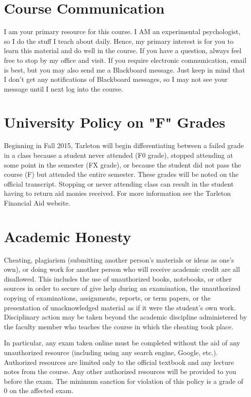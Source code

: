 \documentclass[10pt]{article}
\begin{document}
\section*{Course Communication}
\label{sec-6}

I am your primary resource for this course. I AM an experimental psychologist, so I do the stuff I teach about daily. Hence, my primary interest is for you to learn this material and do well in the course. If you have a question, always feel free to stop by my office and visit.  If you require electronic communication, email is best, but you may also send me a Blackboard message.  Just keep in mind that I don't get any notifications of Blackboard messages, so I may not see your message until I next log into the course.

\section*{University Policy on "F" Grades}
\label{sec-7}

Beginning in Fall 2015, Tarleton will begin differentiating between a failed grade in a class because a student never attended (F0 grade), stopped attending at some point in the semester (FX grade), or because the student did not pass the course (F) but attended the entire semester. These grades will be noted on the official transcript. Stopping or never attending class can result in the student having to return aid monies received.  For more information see the Tarleton Financial Aid website.

\section*{Academic Honesty}
\label{sec-8}

Cheating, plagiarism (submitting another person’s materials or ideas as one’s own), or doing work for another person who will receive academic credit are all disallowed. This includes the use of unauthorized books, notebooks, or other sources in order to secure of give help during an examination, the unauthorized copying of examinations, assignments, reports, or term papers, or the presentation of unacknowledged material as if it were the student’s own work. Disciplinary action may be taken beyond the academic discipline administered by the faculty member who teaches the course in which the cheating took place.

In particular, any exam taken online must be completed without the aid of any unauthorized resource (including using any search engine, Google, etc.).  Authorized resources are limited only to the official textbook and any lecture notes from the course.  Any other authorized resources will be provided to you before the exam.  The minimum sanction for violation of this policy is a grade of 0 on the affected exam.
\end{document}
